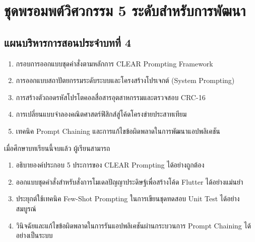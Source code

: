 \chapter{ชุดพรอมพต์วิศวกรรม 5 ระดับสำหรับการพัฒนา}
\label{chap:ch04}

\section*{แผนบริหารการสอนประจำบทที่ 4}

\begin{tcolorbox}[
    enhanced, breakable,
    colback=white, colframe=rbruNavy,
    fonttitle=\bfseries\color{white},
    title={1. หัวข้อเนื้อหาประจำบท},
    arc=1.5mm, boxrule=0.8pt, leftrule=3.5mm
]
\begin{enumerate}
    \item กรอบการออกแบบชุดคำสั่งตามหลักการ CLEAR Prompting Framework
    \item การออกแบบสถาปัตยกรรมระดับระบบและโครงสร้างโปรเจกต์ (System Prompting)
    \item การสร้างตัวถอดรหัสโปรโตคอลสื่อสารอุตสาหกรรมและตรวจสอบ CRC-16
    \item การเปลี่ยนแบบจำลองคณิตศาสตร์ฟิสิกส์สู่โค้ดโครงข่ายประสาทเทียม
    \item เทคนิค Prompt Chaining และการแก้ไขข้อผิดพลาดในการพัฒนาแอปพลิเคชัน
\end{enumerate}
\end{tcolorbox}

\begin{tcolorbox}[
    enhanced, breakable,
    colback=white, colframe=rbruNavy,
    fonttitle=\bfseries\color{white},
    title={2. วัตถุประสงค์เชิงพฤติกรรม},
    arc=1.5mm, boxrule=0.8pt, leftrule=3.5mm
]
เมื่อศึกษาบทเรียนนี้จบแล้ว ผู้เรียนสามารถ
\begin{enumerate}
    \item อธิบายองค์ประกอบ 5 ประการของ CLEAR Prompting ได้อย่างถูกต้อง
    \item ออกแบบชุดคำสั่งสำหรับสั่งการโมเดลปัญญาประดิษฐ์เพื่อสร้างโค้ด Flutter ได้อย่างแม่นยำ
    \item ประยุกต์ใช้เทคนิค Few-Shot Prompting ในการเขียนชุดทดสอบ Unit Test ได้อย่างสมบูรณ์
    \item วินิจฉัยและแก้ไขข้อผิดพลาดในการรันแอปพลิเคชันผ่านกระบวนการ Prompt Chaining ได้อย่างเป็นระบบ
\end{enumerate}
\end{tcolorbox}

